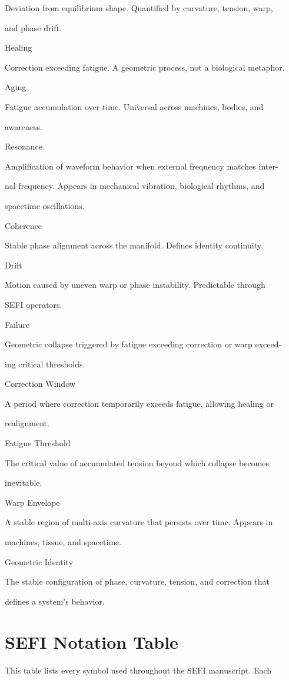 \documentclass[10pt]{article}
\begin{document}
Deviation from equilibrium shape. Quantified by curvature, tension, warp,

and phase drift.


Healing

Correction exceeding fatigue. A geometric process, not a biological metaphor.

Aging

Fatigue accumulation over time. Universal across machines, bodies, and

awareness.

Resonance

Amplification of waveform behavior when external frequency matches inter-

nal frequency. Appears in mechanical vibration, biological rhythms, and

spacetime oscillations.

Coherence

Stable phase alignment across the manifold. Defines identity continuity.

Drift

Motion caused by uneven warp or phase instability. Predictable through

SEFI operators.

Failure

Geometric collapse triggered by fatigue exceeding correction or warp exceed-

ing critical thresholds.

Correction Window

A period where correction temporarily exceeds fatigue, allowing healing or

realignment.

Fatigue Threshold

The critical value of accumulated tension beyond which collapse becomes

inevitable.


Warp Envelope

A stable region of multi-axis curvature that persists over time. Appears in

machines, tissue, and spacetime.

Geometric Identity

The stable configuration of phase, curvature, tension, and correction that

defines a system's behavior.

\section*{SEFI Notation Table}
This table lists every symbol used throughout the SEFI manuscript. Each
\end{document}
